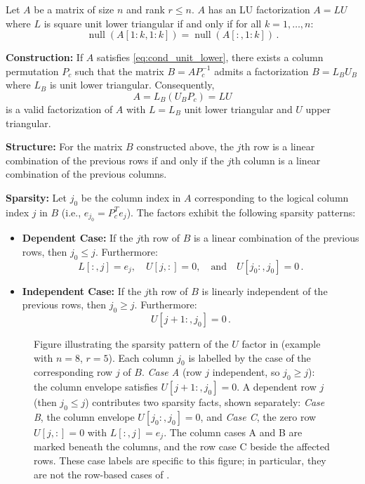 \documentclass[final]{siamart1116}
\numberwithin{theorem}{section}
\DeclareMathOperator{\nl}{null}
\begin{document}
\begin{theorem}\label{thm:main_unit_lower}
  Let $A$ be a matrix of size $n$ and rank $r \le n$. $A$ has an LU factorization $A = LU$ where $L$ is square unit lower triangular if and only if for all $k = 1, \ldots, n$:
  \begin{equation}
    \label{eq:cond_unit_lower}
    \nl(A[1:k,1:k]) = \nl(A[:,1:k]) \,.
  \end{equation}

  \noindent\textbf{Construction:} If $A$ satisfies \cref{eq:cond_unit_lower}, there exists a column permutation $P_c$ such that the matrix $B = A P_c^{-1}$ admits a factorization $B = L_B U_B$ where $L_B$ is unit lower triangular. Consequently,
  \[ A = L_B (U_B P_c) = L U \]
  is a valid factorization of $A$ with $L=L_B$ unit lower triangular and $U$ upper triangular.

  \noindent\textbf{Structure:} For the matrix $B$ constructed above, the $j$th row is a linear combination of the previous rows if and only if the $j$th column is a linear combination of the previous columns.

  \noindent\textbf{Sparsity:} Let $j_0$ be the column index in $A$ corresponding to the logical column index $j$ in $B$ (i.e., $e_{j_0} = P_c^T e_j$). The factors exhibit the following sparsity patterns:
  \begin{itemize}
    \item \textbf{Dependent Case:} If the $j$th row of $B$ is a linear combination of the previous rows, then $j_0 \le j$. Furthermore:
      \[ L[:,j] = e_j, \quad U[j,:] = 0, \quad \text{and} \quad U[j_0:, j_0] = 0 \,. \]
    \item \textbf{Independent Case:} If the $j$th row of $B$ is linearly independent of the previous rows, then $j_0 \ge j$. Furthermore:
      \[ U[j+1:, j_0] = 0 \,. \]
  \end{itemize}
\end{theorem}

\begin{figure}[htbp]
  \centering
  
  \caption{Figure illustrating the sparsity pattern of the $U$ factor in  (example with $n=8$, $r=5$). Each column $j_0$ is labelled by the case of the corresponding row $j$ of $B$. \emph{Case A} (row $j$ independent, so $j_0 \ge j$): the column envelope satisfies $U[j+1:,j_0]=0$. A dependent row $j$ (then $j_0 \le j$) contributes two sparsity facts, shown separately: \emph{Case B}, the column envelope $U[j_0:,j_0]=0$, and \emph{Case C}, the zero row $U[j,:]=0$ with $L[:,j]=e_j$. The column cases A and B are marked beneath the columns, and the row case C beside the affected rows. These case labels are specific to this figure; in particular, they are not the row-based cases of .}
  \label{fig:unit_lower_sparsity}
\end{figure}
\end{document}
